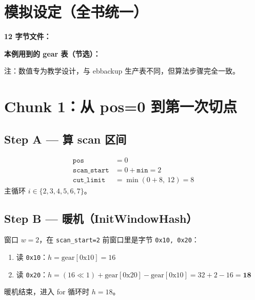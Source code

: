 
\section{模拟设定（全书统一）}

\begin{simbox}[玩具文件与参数]
\SimPara

\vspace{0.5em}
\textbf{12 字节文件：}\par
\SimFileTab

\vspace{0.5em}
\textbf{本例用到的 gear 表（节选）：}\par
\SimGearTab

{\footnotesize 注：数值专为教学设计，与 ebbackup 生产表不同，但算法步骤完全一致。}
\end{simbox}

\section{Chunk 1：从 pos=0 到第一次切点}

\subsection{Step A — 算 scan 区间}

\begin{simbox}[护栏模拟]
\begin{align*}
\texttt{pos} &= 0 \\
\texttt{scan\_start} &= 0 + \texttt{min} = 2 \\
\texttt{cut\_limit} &= \min(0+8,\ 12) = 8
\end{align*}
主循环 $i \in \{2,3,4,5,6,7\}$。
\end{simbox}

\subsection{Step B — 暖机（InitWindowHash）}

窗口 $w=2$，在 \texttt{scan\_start=2} 前窗口里是字节 \texttt{0x10, 0x20}：

\begin{simbox}[暖机算 $h$]
\begin{enumerate}[nosep]
  \item 读 \texttt{0x10}：$h = \mathrm{gear[0x10]} = 16$
  \item 读 \texttt{0x20}：$h = (16 \ll 1) + \mathrm{gear[0x20]} - \mathrm{gear[0x10]}
        = 32 + 2 - 16 = \mathbf{18}$
\end{enumerate}
暖机结束，进入 for 循环时 $h=18$。
\end{simbox}

